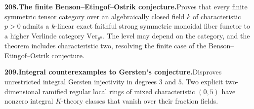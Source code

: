 \documentclass[11pt,a4paper]{article}
\begin{document}
  \par \begin{minipage}{\linewidth}
  \fontsize{10.5}{12.6}\selectfont\RaggedRight
  \hypertarget{result 208}{}
  {\bfseries\textcolor{muted}{208.}\enspace The finite Benson--Etingof--Ostrik conjecture.}\enspace Proves that every finite symmetric tensor category over an algebraically closed field $k$ of characteristic $p>0$ admits a $k$-linear exact faithful strong symmetric monoidal fiber functor to a higher Verlinde category $\mathrm{Ver}_{p^n}$. The level may depend on the category, and the theorem includes characteristic two, resolving the finite case of the Benson--Etingof--Ostrik conjecture.\par
  \end{minipage}\par\vspace{5pt}



  \par \begin{minipage}{\linewidth}
  \fontsize{10.5}{12.6}\selectfont\RaggedRight
  \hypertarget{result 209}{}
  {\bfseries\textcolor{muted}{209.}\enspace Integral counterexamples to Gersten’s conjecture.}\enspace Disproves unrestricted integral Gersten injectivity in degrees $3$ and $5$. Two explicit two-dimensional ramified regular local rings of mixed characteristic $(0,5)$ have nonzero integral $K$-theory classes that vanish over their fraction fields.\par
  \end{minipage}\par\vspace{5pt}
\end{document}

